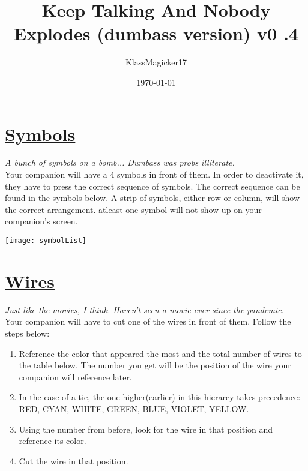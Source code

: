 \documentclass[letterpaper,12pt]{report}
\begin{document}
\title{\textbf{Keep Talking And Nobody Explodes (dumbass version) v0  .4}}
\author{KlassMagicker17}
\date{\today}
\maketitle

\section*{\underline{Symbols}}
\textit{A bunch of symbols on a bomb... Dumbass was probs illiterate.}\\[1cm]
Your companion will have a 4 symbols in front of them. In order to deactivate it,
they have to press the correct sequence of symbols. The correct sequence can be found in the symbols below. A strip of symbols, either row or column, will show the correct arrangement. atleast one symbol will not show up on your companion's screen.
\begin{center}
  \texttt{[image: symbolList]}
\end{center}
\pagebreak

\section*{\underline{Wires}}
\textit{Just like the movies, I think. Haven't seen a movie ever since the pandemic.}\\[1cm]
Your companion will have to cut one of the wires in front of them. Follow the steps below:

\begin{enumerate}
  \item Reference the color that appeared the most and the total number of wires to the table below.
  The number you get will be the position of the wire your companion will reference later.
  \item In the case of a tie, the one higher(earlier) in this hierarcy takes precedence: RED, CYAN, WHITE, GREEN, BLUE, VIOLET, YELLOW.
  \item Using the number from before, look for the wire in that position and reference its color.
  \item Cut the wire in that position.
\end{enumerate}
\end{document}
